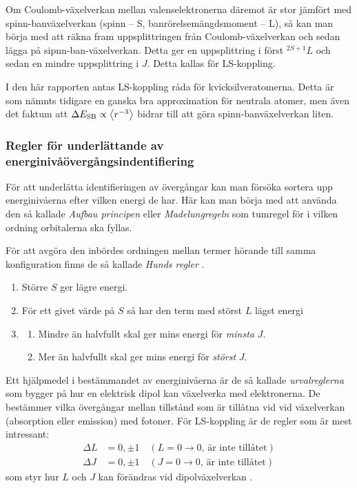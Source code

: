 \documentclass[11pt,a4paper]{article}
\begin{document}
Om Coulomb-växelverkan mellan valenselektronerna däremot är stor
jämfört med spinn-banväxelverkan (spinn -- S, banrörelsemängdsmoment
-- L), så kan man börja med att räkna fram uppsplittringen från
Coulomb-växelverkan och sedan lägga på sipnn-ban-växelverkan. Detta
ger en uppsplittring i först $^{2S+1}L$ och sedan en mindre
uppsplittring i $J$. Detta kallas för LS-koppling. 

I den här rapporten antas LS-koppling råda för
kvicksilveratomerna. Detta är som nämnts tidigare en ganska bra
approximation för neutrala atomer, men även det faktum att $\Delta
E_\text{SB} \propto \ev{r^{-3}}$ bidrar till att göra
spinn-banväxelverkan liten. 



\subsubsection{Regler för underlättande av energinivåövergångsindentifiering} 
\label{sec:regler}
För att underlätta identifieringen av övergångar kan man försöka
sortera upp energinivåerna efter vilken energi de har. Här kan man
börja med att använda den så kallade \emph{Aufbau principen} eller
\emph{Madelungregeln} som tumregel för i vilken ordning orbitalerna
ska fyllas\cite{wiki:aufbau}.

För att avgöra den inbördes ordningen mellan termer hörande till samma
konfiguration finns de så kallade \emph{Hunds regler} \cite{Bransden}. 
\begin{enumerate}
    \item Större $S$ ger lägre energi.
    \item För ett givet värde på $S$ så har den term med störst $L$ lägst energi
    \item 
    \begin{enumerate}
        \item Mindre än halvfullt skal ger mins energi för \emph{minsta} $J$.
        \item Mer än halvfullt skal ger mins energi för \emph{störst} $J$.
    \end{enumerate}
\end{enumerate}

Ett hjälpmedel i bestämmandet av energinivåerna är de så
kallade \emph{urvalreglerna} som bygger på hur en elektrisk dipol kan
växelverka med elektronerna. De bestämmer vilka övergångar mellan
tillstånd som är tillåtna vid vid växelverkan (absorption eller
emission) med fotoner. För LS-koppling är de regler som är mest intressant:  
\begin{equation*}
\begin{aligned}
\Delta L &= 0, \pm 1 \quad (L=0\to 0\text{, är inte tillåtet})\\
\Delta J &= 0, \pm 1 \quad (J=0\to 0\text{, är inte tillåtet})
\end{aligned}
\end{equation*}
som styr hur $L$ och $J$ kan förändras vid dipolväxelverkan \cite{Bransden}.
\end{document}
